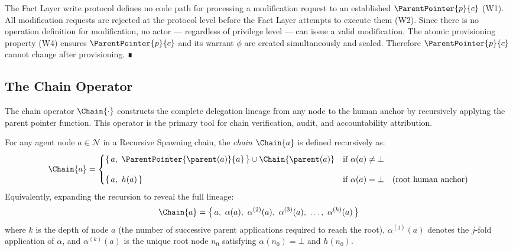 \begin{pf}
The Fact Layer write protocol defines no code path for processing a modification request to an established $\ParentPointer{p}{c}$ (W1). All modification requests are rejected at the protocol level before the Fact Layer attempts to execute them (W2). Since there is no operation definition for modification, no actor --- regardless of privilege level --- can issue a valid modification. The atomic provisioning property (W4) ensures $\ParentPointer{p}{c}$ and its warrant $\phi$ are created simultaneously and sealed. Therefore $\ParentPointer{p}{c}$ cannot change after provisioning. ∎
\end{pf}

\subsection{The Chain Operator}
\label{sec:chain-operator}

The chain operator $\Chain{\cdot}$ constructs the complete delegation lineage from any node to the human anchor by recursively applying the parent pointer function. This operator is the primary tool for chain verification, audit, and accountability attribution.

\begin{dfn}
\label{def:chain-operator}
For any agent node $a \in \mathcal{N}$ in a Recursive Spawning chain, the \emph{chain} $\Chain{a}$ is defined recursively as:
\begin{equation}
\Chain{a} =
\begin{cases}
\{\,a,\ \ParentPointer{\parent(a)}{a}\,\} \cup \Chain{\parent(a)} & \text{if } \alpha(a) \neq \bot \\[10pt]
\{\,a,\ h(a)\,\} & \text{if } \alpha(a) = \bot \quad \text{(root human anchor)}
\end{cases}
\label{eq:chain-recursive}
\end{equation}
Equivalently, expanding the recursion to reveal the full lineage:
\begin{equation}
\Chain{a} = \bigl\{\, a,\ \alpha(a),\ \alpha^{(2)}(a),\ \alpha^{(3)}(a),\ \ldots,\ \alpha^{(k)}(a) \,\bigr\}
\label{eq:chain-expanded}
\end{equation}
where $k$ is the depth of node $a$ (the number of successive parent applications required to reach the root), $\alpha^{(j)}(a)$ denotes the $j$-fold application of $\alpha$, and $\alpha^{(k)}(a)$ is the unique root node $n_0$ satisfying $\alpha(n_0) = \bot$ and $h(n_0)$.
\end{dfn}

